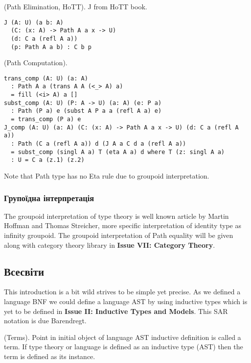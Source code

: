 \begin{theorem} (Path Elimination, HoTT).
J from HoTT book.
\begin{lstlisting}
J (A: U) (a b: A)
  (C: (x: A) -> Path A a x -> U)
  (d: C a (refl A a))
  (p: Path A a b) : C b p
\end{lstlisting}
\end{theorem}

\begin{theorem} (Path Computation).
\begin{lstlisting}
trans_comp (A: U) (a: A)
  : Path A a (trans A A (<_> A) a)
  = fill (<i> A) a []
subst_comp (A: U) (P: A -> U) (a: A) (e: P a)
  : Path (P a) e (subst A P a a (refl A a) e)
  = trans_comp (P a) e
J_comp (A: U) (a: A) (C: (x: A) -> Path A a x -> U) (d: C a (refl A a))
  : Path (C a (refl A a)) d (J A a C d a (refl A a))
  = subst_comp (singl A a) T (eta A a) d where T (z: singl A a)
  : U = C a (z.1) (z.2)
\end{lstlisting}
\end{theorem}

Note that  Path type has no Eta rule due to groupoid interpretation.

\newpage
\subsubsection{Групоїдна інтерпретація}

The groupoid interpretation of type theory is well known article by Martin Hoffman and Thomas Streicher,
more specific interpretation of identity type as infinity groupoid.
The groupoid interpretation of Path equality will be given along with category theory library
in \textbf{Issue VII: Category Theory}.

\subsection{Всесвіти}

This introduction is a bit wild strives to be simple yet precise.
As we defined a language BNF we could define a language AST by
using inductive types which is yet to be defined
in \textbf{Issue II: Inductive Types and Models}. This SAR notation is due Barendregt.

\begin{definition} (Terms). Point in initial object of language AST
inductive definition is called a term. If type theory or language is defined as
an inductive type (AST) then the term is defined as its instance.
\end{definition}

